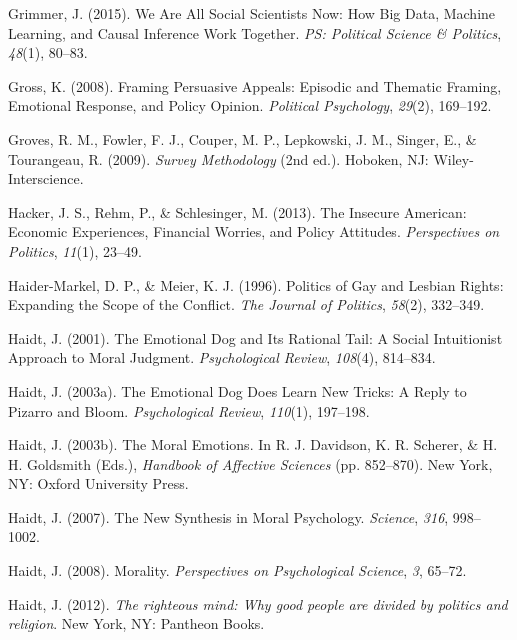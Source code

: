 \documentclass[12pt,econ]{sources/authesis}
\begin{document}
\leavevmode\hypertarget{ref-grimmer_2015_social}{}%
Grimmer, J. (2015). We Are All Social Scientists Now: How Big Data, Machine Learning, and Causal Inference Work Together. \emph{PS: Political Science \& Politics}, \emph{48}(1), 80--83.

\leavevmode\hypertarget{ref-gross_framing_2008}{}%
Gross, K. (2008). Framing Persuasive Appeals: Episodic and Thematic Framing, Emotional Response, and Policy Opinion. \emph{Political Psychology}, \emph{29}(2), 169--192.

\leavevmode\hypertarget{ref-groves_survey_2009}{}%
Groves, R. M., Fowler, F. J., Couper, M. P., Lepkowski, J. M., Singer, E., \& Tourangeau, R. (2009). \emph{Survey Methodology} (2nd ed.). Hoboken, NJ: Wiley-Interscience.

\leavevmode\hypertarget{ref-hacker_insecure_2013}{}%
Hacker, J. S., Rehm, P., \& Schlesinger, M. (2013). The Insecure American: Economic Experiences, Financial Worries, and Policy Attitudes. \emph{Perspectives on Politics}, \emph{11}(1), 23--49.

\leavevmode\hypertarget{ref-haider-markel_1996_politics}{}%
Haider-Markel, D. P., \& Meier, K. J. (1996). Politics of Gay and Lesbian Rights: Expanding the Scope of the Conflict. \emph{The Journal of Politics}, \emph{58}(2), 332--349.

\leavevmode\hypertarget{ref-haidt_2001_emotional}{}%
Haidt, J. (2001). The Emotional Dog and Its Rational Tail: A Social Intuitionist Approach to Moral Judgment. \emph{Psychological Review}, \emph{108}(4), 814--834.

\leavevmode\hypertarget{ref-haidt_2003_emotional}{}%
Haidt, J. (2003a). The Emotional Dog Does Learn New Tricks: A Reply to Pizarro and Bloom. \emph{Psychological Review}, \emph{110}(1), 197--198.

\leavevmode\hypertarget{ref-haidt_moral_2003}{}%
Haidt, J. (2003b). The Moral Emotions. In R. J. Davidson, K. R. Scherer, \& H. H. Goldsmith (Eds.), \emph{Handbook of Affective Sciences} (pp. 852--870). New York, NY: Oxford University Press.

\leavevmode\hypertarget{ref-haidt_2007_synthesis}{}%
Haidt, J. (2007). The New Synthesis in Moral Psychology. \emph{Science}, \emph{316}, 998--1002.

\leavevmode\hypertarget{ref-haidt_2008_morality}{}%
Haidt, J. (2008). Morality. \emph{Perspectives on Psychological Science}, \emph{3}, 65--72.

\leavevmode\hypertarget{ref-haidt_2012_righteous}{}%
Haidt, J. (2012). \emph{The righteous mind: Why good people are divided by politics and religion}. New York, NY: Pantheon Books.
\end{document}
